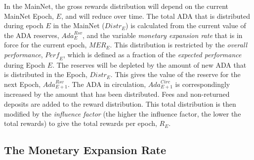 \documentclass[11pt,a4paper,dvipsnames,twosided,final]{article}
\newcommand{\khcomment}[1]{\todo[color=blue!20]{KH: #1}}
\newcommand{\ada}{ADA{}}
\begin{document}
\noindent
In the MainNet, the gross rewards distribution will depend on the current MainNet Epoch, $E$, and will reduce over time.
The total \ada{} that is distributed during epoch $E$ in the MainNet (${\textit{Distr}}_E$) is calculated from the current
value of the \ada{} reserves, $\textit{Ada}^{\textit{Rsv}}_E$, and the variable \emph{monetary expansion rate} that is in force for
the current epoch, $\textit{MER}_E$.
%
This distribution is restricted by the \emph{overall performance}, $\textit{Perf}_E$, which is defined as a fraction of the \emph{expected performance} during Epoch $E$.
%
The reserves will be depleted by the amount of new \ada{} that is distributed in the Epoch, $\textit{Distr}_E$. This gives the
value of the reserve for the next Epoch, $\textit{Ada}^{\textit{Rsv}}_{E+1}$.  The \ada{} in circulation, $\textit{Ada}^{\textit{Circ}}_{E+1}$
is correspondingly increased by the amount that has been distributed.
%
Fees and non-returned deposits are added to the reward distribution.  This total distribution is then modified by the \emph{influence factor}
(the higher the influence factor, the lower the total rewards) to give the total rewards per epoch, $R_E$.

%

\subsection{The Monetary Expansion Rate}
\label{sec:expansion}
\end{document}
